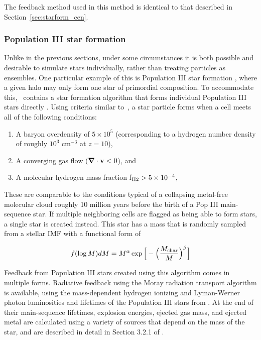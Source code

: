 The feedback method used in this method is identical to that described
in Section~\ref{sec:starform_cen}.

\subsubsection{Population III star formation}
\label{sec:starform_pop3}

Unlike in the previous sections, under some circumstances it is both
possible and desirable to simulate stars individually, rather than
treating particles as ensembles.  One particular example of this is
Population III star formation
\citep{ABN02,2007ApJ...654...66O,2008ApJ...685...40W,2009Sci...325..601T},
where a given halo may only form one star of primordial composition.
To accommodate this, \enzo\ contains a star formation algorithm that
forms individual Population III stars directly \citep{2007ApJ...659L..87A,
  2008ApJ...685...40W, 2012MNRAS.427..311W}.  Using criteria similar
to~\citet{CO1992}, a star particle forms when a cell meets all of the
following conditions:

\begin{enumerate}
\item A baryon overdensity of $5 \times 10^5$ (corresponding to a
  hydrogen number density of 
  roughly $10^3$ cm$^{-3}$ at $z=10$),

\item A converging gas flow ($\bm{\nabla} \cdot \mathbf{v} < 0$), and

\item A molecular hydrogen mass fraction f$_{\rm H2} > 5 \times 10^{-4}$,
\end{enumerate}

These are comparable to the conditions typical of a collapsing metal-free molecular cloud roughly
10 million years before the birth of a Pop III main-sequence star.  If
multiple neighboring cells are flagged as being able to form stars, a
single star is created instead.  This star has a mass that is randomly
sampled from a stellar IMF with a functional form of

\begin{equation}
f(\log M) dM = M^{\alpha} \exp \Big[ -\Big( \frac{M_{\rm char}}{M}
\Big)^{\beta} \Big]
\end{equation}

Feedback from Population III stars created using this algorithm comes in multiple forms.
Radiative feedback using the Moray radiation transport algorithm
\citep{Wise11_Moray} is available, using the mass-dependent hydrogen
ionizing and Lyman-Werner photon luminosities and lifetimes of the
Population III stars from \citet{2002A&A...382...28S}.  At the end of
their main-sequence lifetimes, explosion energies, ejected gas mass,
and ejected metal are calculated using a variety of sources that
depend on the mass of the star, and are described in detail in Section
3.2.1 of \citet{2012MNRAS.427..311W}.


